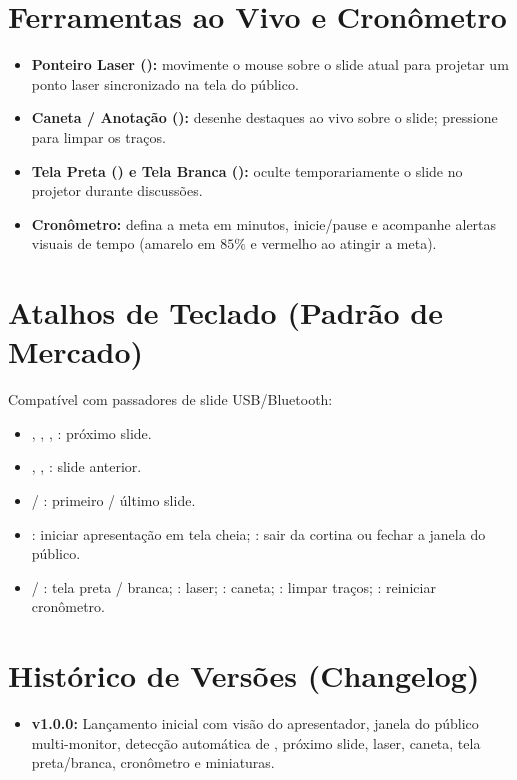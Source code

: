 \documentclass[11pt,a4paper]{article}
\begin{document}
\section{Ferramentas ao Vivo e Cronômetro}
\begin{itemize}
  \item \textbf{Ponteiro Laser ():} movimente o mouse sobre o slide atual para projetar um ponto laser sincronizado na tela do público.
  \item \textbf{Caneta / Anotação ():} desenhe destaques ao vivo sobre o slide; pressione  para limpar os traços.
  \item \textbf{Tela Preta () e Tela Branca ():} oculte temporariamente o slide no projetor durante discussões.
  \item \textbf{Cronômetro:} defina a meta em minutos, inicie/pause e acompanhe alertas visuais de tempo (amarelo em $85\%$ e vermelho ao atingir a meta).
\end{itemize}

\section{Atalhos de Teclado (Padrão de Mercado)}
Compatível com passadores de slide USB/Bluetooth:
\begin{itemize}
  \item \code{$\rightarrow$}, , , : próximo slide.
  \item \code{$\leftarrow$}, , : slide anterior.
  \item {} / : primeiro / último slide.
  \item {}: iniciar apresentação em tela cheia; : sair da cortina ou fechar a janela do público.
  \item {} / : tela preta / branca; : laser; : caneta; : limpar traços; : reiniciar cronômetro.
\end{itemize}

\section{Histórico de Versões (Changelog)}
\begin{itemize}
  \item \textbf{v1.0.0:} Lançamento inicial com visão do apresentador, janela do público multi-monitor, detecção automática de , próximo slide, laser, caneta, tela preta/branca, cronômetro e miniaturas.
\end{itemize}
\end{document}
